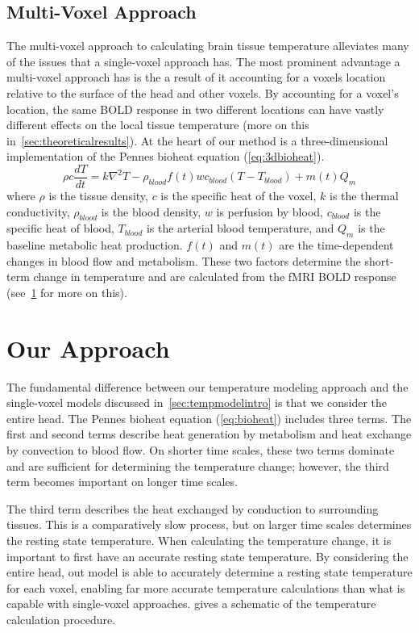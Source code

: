     \subsection{\label{sec:multivox} Multi-Voxel Approach}
    The multi-voxel approach to calculating brain tissue temperature alleviates many of the issues that a single-voxel approach has.  The most prominent advantage a multi-voxel approach has is the a result of it accounting for a voxels location relative to the surface of the head and other voxels.  By accounting for a voxel's location, the same BOLD response in two different locations can have vastly different effects on the local tissue temperature (more on this in~\cref{sec:theoreticalresults}).
    At the heart of our method is a three-dimensional implementation of the Pennes bioheat equation (\cref{eq:3dbioheat})\citep{collins}.
    \begin{equation} \label{eq:3dbioheat} 
    	\rho c \frac{dT}{dt} = k \nabla^{2}T-\rho_{blood}f(t)wc_{blood}(T-T_{blood})+m(t)Q_{m} 
    \end{equation}
  where $\rho$ is the tissue density, $c$ is the specific heat of the voxel, $k$ is the thermal conductivity, $\rho_{blood}$ is the blood density, $w$ is perfusion by blood, $c_{blood}$ is the specific heat of blood, $T_{blood}$ is the arterial blood temperature, and $Q_{m}$ is the baseline metabolic heat production. $f(t)$ and $m(t)$ are the time-dependent changes in blood flow and metabolism. These two factors determine the short-term change in temperature and are calculated from the fMRI BOLD response (see~\cref{sec:approach} for more on this).

\section{Our Approach}
  \label{sec:approach}
  The fundamental difference between our temperature modeling approach and the single-voxel models discussed in~\cref{sec:tempmodelintro} is that we consider the entire head. The Pennes bioheat equation (\cref{eq:bioheat}) \citep{pennes,sotero2011} includes three terms. The first and second terms describe heat generation by metabolism and heat exchange by convection to blood flow.  On shorter time scales, these two terms dominate and are sufficient for determining the temperature change; however, the third term becomes important on longer time scales.
  
  The third term describes the heat exchanged by conduction to surrounding tissues.  This is a comparatively slow process, but on larger time scales determines the resting state temperature.  When calculating the temperature change, it is important to first have an accurate resting state temperature.  By considering the entire head, out model is able to accurately determine a resting state temperature for each voxel, enabling far more accurate temperature calculations than what is capable with single-voxel approaches.   gives a schematic of the temperature calculation procedure.
  
